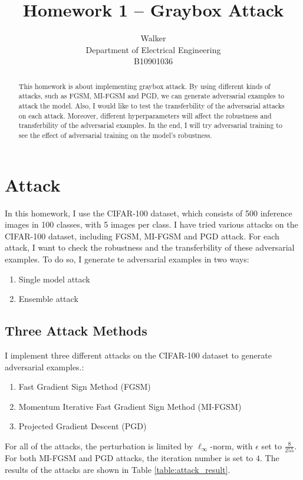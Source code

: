 \documentclass{article}
\title{Homework 1 -- Graybox Attack}
\author{%
  Walker \\
  Department of Electrical Engineering \\
  B10901036 \\
}
\begin{document}
\maketitle


\begin{abstract}
  This homework is about implementing graybox attack.
  By using different kinds of attacks, such as FGSM, MI-FGSM and PGD, we can generate adversarial examples to attack the model.
  Also, I would like to test the transferbility of the adversarial attacks on each attack.
  Moreover, different hyperparameters will affect the robustness and transferbility of the adversarial examples.
  In the end, I will try adversarial training to see the effect of adversarial training on the model's robustness.
\end{abstract}

\section{Attack}
In this homework, I use the CIFAR-100 dataset, which consists of 500 inference images in 100 classes, with 5 images per class.
I have tried various attacks on the CIFAR-100 dataset, including FGSM, MI-FGSM and PGD attack.
For each attack, I want to check the robustness and the transferbility of these adversarial examples.
To do so, I generate te adversarial examples in two ways:

\begin{enumerate}
    \item Single model attack
    \item Ensemble attack
\end{enumerate}



\subsection{Three Attack Methods}
I implement three different attacks on the CIFAR-100 dataset to generate adversarial examples.:

\begin{enumerate}
  \item Fast Gradient Sign Method (FGSM)
  \item Momentum Iterative Fast Gradient Sign Method (MI-FGSM)
  \item Projected Gradient Descent (PGD)
\end{enumerate}

For all of the attacks, the perturbation is limited by $\ell_\infty$-norm, with $\epsilon$ set to $\frac{8}{255}$.
For both MI-FGSM and PGD attacks, the iteration number is set to $4$.
The results of the attacks are shown in Table \ref{table:attack_result}.
\end{document}
